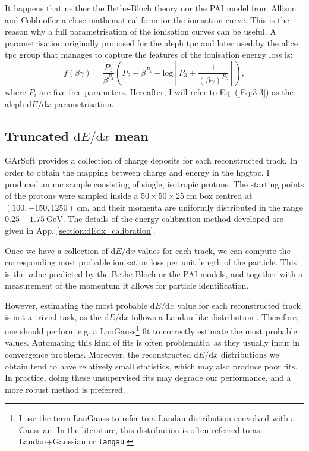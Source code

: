 It happens that neither the Bethe-Bloch theory nor the PAI model from Allison and Cobb offer a close mathematical form for the ionisation curve. This is the reason why a full parametrisation of the ionisation curves can be useful. A parametrisation originally proposed for the \gls{aleph} \gls{tpc} \cite{Blum2008} and later used by the \gls{alice} \gls{tpc} \cite{ALICETPC2013} group that manages to capture the features of the ionisation energy loss is:
\begin{equation}\label{Eq:3.3}
    f(\beta\gamma) = \frac{P_{1}}{\beta^{P_{4}}}\left(P_{2}-\beta^{P_{4}}-\mathrm{log}\left[P_{3}+\frac{1}{(\beta\gamma)^{P_{5}}}\right]\right),
\end{equation}
where $P_{i}$ are five free parameters. Hereafter, I will refer to Eq. (\ref{Eq:3.3}) as the \gls{aleph} $\mathrm{d}E/\mathrm{d}x$ parametrisation.

\subsection[Truncated \texorpdfstring{$\mathrm{d}E/\mathrm{d}x$}{dE/dx} mean]{Truncated \boldmath\texorpdfstring{$\mathrm{d}E/\mathrm{d}x$}{dE/dx} mean} \label{subsec:mean_dEdx}

GArSoft provides a collection of charge deposits for each reconstructed track. In order to obtain the mapping between charge and energy in the \gls{hpgtpc}, I produced an \gls{mc} sample consisting of single, isotropic protons. The starting points of the protons were sampled inside a $50\times50\times25 \ \mathrm{cm}$ box centred at $(100, -150, 1250)~\mathrm{cm}$, and their momenta are uniformly distributed in the range $0.25 - 1.75 ~ \mathrm{GeV}$. The details of the energy calibration method developed are given in App. \ref{section:dEdx_calibration}.

Once we have a collection of $\mathrm{d}E/\mathrm{d}x$ values for each track, we can compute the corresponding most probable ionisation loss per unit length of the particle. This is the value predicted by the Bethe-Bloch or the PAI models, and together with a measurement of the momentum it allows for particle identification.

However, estimating the most probable $\mathrm{d}E/\mathrm{d}x$ value for each reconstructed track is not a trivial task, as the $\mathrm{d}E/\mathrm{d}x$ follows a Landau-like distribution \cite{Landau1944}. Therefore, one should perform e.g. a LanGauss\footnote{I use the term LanGauss to refer to a Landau distribution convolved with a Gaussian. In the literature, this distribution is often referred to as Landau+Gaussian or \texttt{langau}.} fit to correctly estimate the most probable values. Automating this kind of fits is often problematic, as they usually incur in convergence problems. Moreover, the reconstructed $\mathrm{d}E/\mathrm{d}x$ distributions we obtain tend to have relatively small statistics, which may also produce poor fits. In practice, doing these unsupervised fits may degrade our performance, and a more robust method is preferred.

